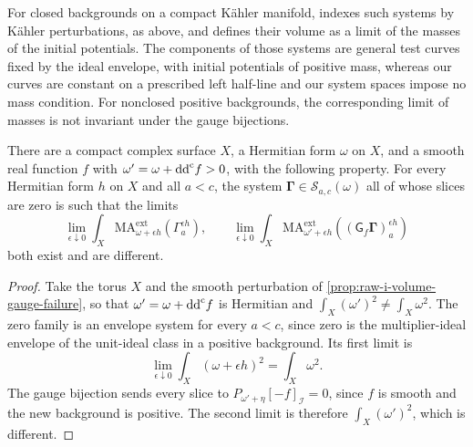 For closed backgrounds on a compact K\"ahler manifold, \cite[Section~13.1]{SGPT} indexes such systems by K\"ahler perturbations, as above, and defines their volume as a limit of the masses of the initial potentials. The components of those systems are general test curves fixed by the ideal envelope, with initial potentials of positive mass, whereas our curves are constant on a prescribed left half-line and our system spaces impose no mass condition. For nonclosed positive backgrounds, the corresponding limit of masses is not invariant under the gauge bijections.

\begin{proposition}\label{prop:envelope-system-raw-volume-failure}
There are a compact complex surface $X$, a Hermitian form $\omega$ on $X$, and a smooth real function $f$ with $\omega'=\omega+\mathrm{dd}^{\mathrm{c}} f>0$, with the following property. For every Hermitian form $h$ on $X$ and all $a<c$, the system $\boldsymbol\Gamma\in\mathscr S_{a,c}(\omega)$ all of whose slices are zero is such that the limits
\[
 \lim_{\epsilon\downarrow0}
 \int_X\mathrm{MA}^{\mathrm{ext}}_{\omega+\epsilon h}
          (\Gamma^{\epsilon h}_a),
 \qquad
 \lim_{\epsilon\downarrow0}
 \int_X\mathrm{MA}^{\mathrm{ext}}_{\omega'+\epsilon h}
          ((\mathsf G_f\boldsymbol\Gamma)^{\epsilon h}_a)
\]
both exist and are different.
\end{proposition}
\begin{proof}
Take the torus $X$ and the smooth perturbation of \cref{prop:raw-i-volume-gauge-failure}, so that $\omega'=\omega+\mathrm{dd}^{\mathrm{c}} f$ is Hermitian and $\int_X(\omega')^2\neq\int_X\omega^2$. The zero family is an envelope system for every $a<c$, since zero is the multiplier-ideal envelope of the unit-ideal class in a positive background. Its first limit is
\[
 \lim_{\epsilon\downarrow0}\int_X(\omega+\epsilon h)^2
                          =\int_X\omega^2.
\]
The gauge bijection sends every slice to $P_{\omega'+\eta}[-f]_{\mathcal I}=0$, since $f$ is smooth and the new background is positive. The second limit is therefore $\int_X(\omega')^2$, which is different.
\end{proof}



